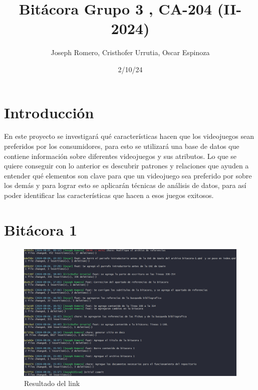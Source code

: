 \documentclass[
  letterpaper,
  DIV=11,
  numbers=noendperiod]{scrreprt}
\title{Bitácora Grupo 3 , CA-204 (II-2024)}
\author{Joseph Romero, Cristhofer Urrutia, Oscar Espinoza}
\date{2/10/24}
\renewcommand*\contentsname{Tabla de contenidos}
\newcommand\contentsname{Tabla de contenidos}
\begin{document}
\maketitle
\ifdefined\Shaded\renewenvironment{Shaded}{\begin{tcolorbox}[frame hidden, interior hidden, sharp corners, enhanced, boxrule=0pt, borderline west={3pt}{0pt}{shadecolor}, breakable]}{\end{tcolorbox}}\fi

\renewcommand*\contentsname{Tabla de contenidos}
{
\hypersetup{linkcolor=}
\setcounter{tocdepth}{2}
\tableofcontents
}

\hypertarget{introducciuxf3n}{%
\chapter*{Introducción}\label{introducciuxf3n}}


En este proyecto se investigará qué características hacen que los
videojuegos sean preferidos por los consumidores, para esto se utilizará
una base de datos que contiene información sobre diferentes videojuegos
y sus atributos. Lo que se quiere conseguir con lo anterior es descubrir
patrones y relaciones que ayuden a entender qué elementos son clave para
que un videojuego sea preferido por sobre los demás y para lograr esto
se aplicarán técnicas de análisis de datos, para así poder identificar
las características que hacen a esos juegos exitosos.


\hypertarget{bituxe1cora-1}{%
\chapter{Bitácora 1}\label{bituxe1cora-1}}

\begin{figure}

{\centering \includegraphics{./imagenes/link-1.png}

}

\caption{Resultado del link}

\end{figure}
\end{document}
